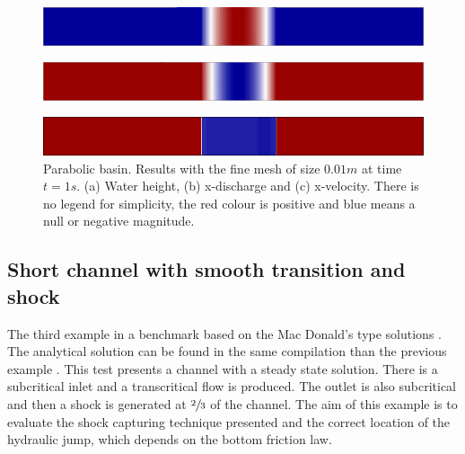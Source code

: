 \documentclass[a4paper,12pt]{elsarticle}
\begin{document}
\begin{figure}[H]
    \begin{subfigure}{.05\textwidth}
        \caption{}
    \end{subfigure}
    \begin{minipage}[c]{.94\textwidth}
        \includegraphics[width=\textwidth]{img/par/height_1.0.png}
    \end{minipage}
\par\medskip
    \begin{subfigure}{.05\textwidth}
        \caption{}
    \end{subfigure}
    \begin{minipage}[c]{.94\textwidth}
        \includegraphics[width=\textwidth]{img/par/momentum_1.0.png}
    \end{minipage}
\par\medskip
    \begin{subfigure}{.05\textwidth}
        \caption{}
    \end{subfigure}
    \begin{minipage}[c]{.94\textwidth}
        \includegraphics[width=\textwidth]{img/par/velocity_1.0.png}
    \end{minipage}
\caption{Parabolic basin. Results with the fine mesh of size $0.01m$ at time $t=1s$. (a) Water height, (b) x-discharge and (c) x-velocity. There is no legend for simplicity, the red colour is positive and blue means a null or negative magnitude.}
\label{parabola_results}
\end{figure}



\subsection{Short channel with smooth transition and shock}

The third example in a benchmark based on the Mac Donald's type solutions \cite{macdonald1997}. The analytical solution can be found in the same compilation than the previous example \cite{delestre2013}. This test presents a channel with a steady state solution. There is a subcritical inlet and a transcritical flow is produced. The outlet is also subcritical and then a shock is generated at $\sfrac{2}{3}$ of the channel. The aim of this example is to evaluate the shock capturing technique presented and the correct location of the hydraulic jump, which depends on the bottom friction law.
\end{document}
